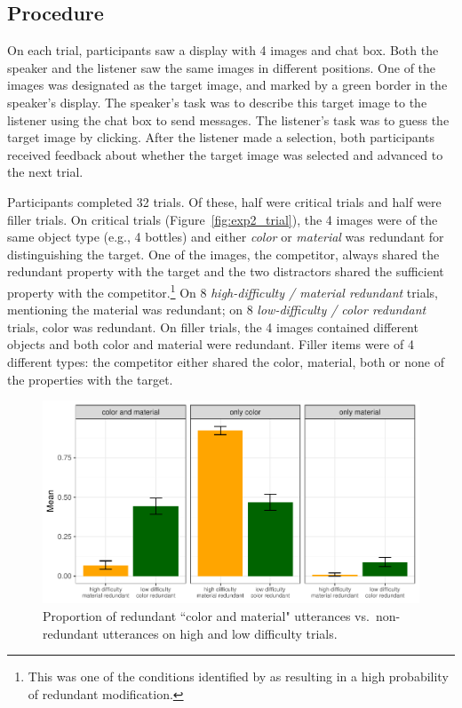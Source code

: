 \documentclass[12pt,letterpaper]{article}
\begin{document}
\subsection{Procedure} 

On each trial, participants saw a display with 4 images and chat box. Both the speaker and the listener saw the same images in different positions. One of the images was designated as the target image, and marked by a green border in the speaker's display. The speaker's task was to describe this target image to the listener using the chat box to send messages. The listener's task was to guess the target image by clicking. After the listener made a selection, both participants received feedback about whether the target image was selected and advanced to the next trial. 

Participants completed 32 trials. Of these, half were critical trials and half were filler trials. On critical trials (Figure~\ref{fig:exp2_trial}), the 4 images were of the same object type (e.g., 4 bottles) and either \textit{color} or \textit{material} was redundant for distinguishing the target. One of the images, the competitor, always shared the redundant property with the target and the two distractors shared the sufficient property with the competitor.\footnote{This was one of the conditions identified by \citet{DegenEtAl2020} as resulting in a high probability of redundant modification.} On 8 \emph{high-difficulty / material redundant} trials, mentioning the material was redundant; on 8 \emph{low-difficulty / color redundant} trials, color was redundant. On filler trials, the 4 images contained different objects and both color and material were redundant. Filler items were of 4 different types: the competitor either shared the color, material, both or none of the properties with the target. 

\begin{figure}[hb]
\centering
\includegraphics[width=.8\textwidth]{plots/exp2_proportion.pdf}
\caption{Proportion of redundant ``color and material" utterances vs.~non-redundant utterances on high and low difficulty trials.}
\label{fig:exp2_proportion}
\end{figure}
\end{document}
